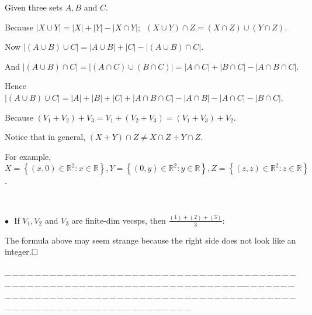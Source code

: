 \documentclass[a4paper, 11pt, UTF8]{article}
\def\Rbb{{\mathbb{R}}}
\def\BulletPoint{{\small$\bullet$}}
\def\ProblemEnding{{\tiny \_\,\_\,\_\,\_\,\_\,\_\,\_\,\_\,\_\,\_\,\_\,\_\,\_\,\_\,\_\,\_\,\_\,\_\,\_\,\_\,\_\,\_\,\_\,\_\,\_\,\_\,\_\,\_\,\_\,\_\,\_\,\_\,\_\,\_\,\_\,\_\,\_\,\_\,\_\,\_\,\_\,\_\,\_\,\_\,\_\,\_\,\_\,\_\,\_\,\_\,\_\,\_\,\_\,\_\,\_\,\_\,\_\,\_\,\_\,\_\,\_\,\_\,\_\,\_\,\_\,\_\,\_\,\_\,\_\,\_\,\_\_\,\_\,\_\,\_\,\_\,\_\,\_\,\_\,\_\,\_\,\_\,\_\,\_\,\_\,\_\,\_\,\_\,\_\,\_\,\_\,\_\,\_\,\_\,\_\,\_\,\_\,\_\,\_\,\_\,\_\,\_\,\_\,\_\,\_\,\_\,\_\,\_\,\_\,\_\,\_\,\_\,\_\,\_\,\_\,\_\,\_\,\_\,\_\,\_\,\_\,\_\,\_\,\_\,\_\,\_\,\_\,\_\,\_\,\_\,\_\,\_\,\_\,\_\,\_\,\_\,\_\,\_\,\_\,\_\,\_\,\_}}
\def\ChapterEnding{\rightline{\timesbfx\Large{E{\small NDED}}}\par\vspace{6pt}}
\begin{document}
\begin{large}
\par{} Given three sets $A,B$ and $C$.\par\quad
Because $\left|X\cup Y\right|=\left|X\right|+\left|Y\right|-\left|X\cap Y\right|;\,\,\,(X\cup Y)\cap Z=(X\cap Z)\cup(Y\cap Z)$.\par\quad
Now $\left|(A\cup B)\cup C\right|=\left|A\cup B\right|+\left|C\right|-\left|(A\cup B)\cap C\right|.$\par\quad
And $\left|(A\cup B)\cap C\right|=\left|(A\cap C)\cup(B\cap C)\right|=\left|A\cap C\right|+\left|B\cap C\right|-\left|A\cap B\cap C\right|.$\par\quad
Hence $\left|(A\cup B)\cup C\right|=\left| A\right|+\left| B\right|+\left| C\right|+\left| A\cap B\cap C\right|-\left| A\cap B\right|-\left| A\cap C\right|-\left| B\cap C\right|.$\par\vspace{12pt}\quad
Because $(V_1+V_2)+V_3=V_1+(V_2+V_3)=(V_1+V_3)+V_2$.\par\quad
{}\par\quad
Notice that in general, $(X+Y)\cap Z\neq X\cap Z+Y\cap Z$.\par\quad
For example, $X=\left\{(x,0)\in\Rbb^2:x\in\Rbb\right\},Y=\left\{(0,y)\in\Rbb^2:y\in\Rbb\right\},Z=\left\{(z,z)\in\Rbb^2:z\in\Rbb\right\}$.\par
{\,}\par
\BulletPoint \,\Corollary \,\,\,{\timessl\Large If $V_1,V_2$ and $V_3$ are finite-dim vecsps, then} {\small $\displaystyle\frac{(1)+(2)+(3)}{3}:$
}\par
{}\par\quad
{\timessl The formula above may seem strange because the right side does not look like an integer.$\hfill\square$}\par
\par
\ProblemEnding\par
\ChapterEnding


\end{large}
\end{document}
